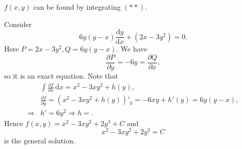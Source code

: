 \documentclass[10pt]{article}
\begin{document}
    $f(x,y)$ can be found by integrating $(**)$.
    \begin{example}
        Consider 
        \[
            6y(y-x)\frac{\mathrm{d}y}{\mathrm{d}x}+(2x-3y^2)=0 
        .\]
        Here $P=2x-3y^2, Q=6y(y-x)$. We have 
        \[
            \frac{\partial P}{\partial y}=-6y= \frac{\partial Q}{\partial x}
        ,\]
        so it is an exact equation.
        Note that 
        \[
            \begin{aligned}
                 &\int \frac{\partial f}{\partial x}  \,\mathrm{d}x=x^2-3xy^2+h(y),\\
                 &\frac{\partial f}{\partial y}=(x^2-3xy^2+h(y))'_y= -6xy+h'(y)=6y(y-x),\\
                 \Longrightarrow & h'=6y^2 \Longrightarrow h=.
            \end{aligned}
        \]
        Hence $f(x,y)=x^2-3xy^2+2y^3+C$ and 
        \[
            x^2-3xy^2+2y^3=C
        \]
        is the general solution. 
    \end{example}
\end{document}
